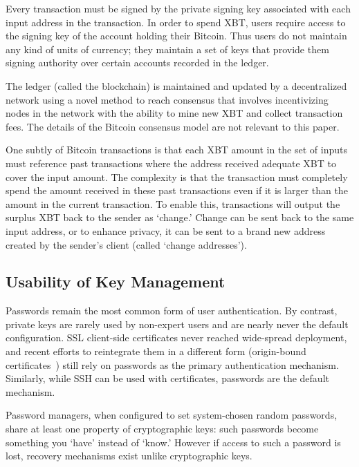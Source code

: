 Every transaction must be signed by the private signing key associated with each input address in the transaction. In order to spend XBT, users require access to the signing key of the account holding their Bitcoin. Thus users do not maintain any kind of units of currency; they maintain a set of keys that provide them signing authority over certain accounts recorded in the ledger. 

The ledger (called the blockchain) is maintained and updated by a decentralized network using a novel method to reach consensus that involves incentivizing nodes in the network with the ability to mine new XBT and collect transaction fees. The details of the Bitcoin consensus model are not relevant to this paper.

One subtly of Bitcoin transactions is that each XBT amount in the set of inputs must reference past transactions where the address received adequate XBT to cover the input amount. The complexity is that the transaction must completely spend the amount received in these past transactions even if it is larger than the amount in the current transaction. To enable this, transactions will output the surplus XBT back to the sender as `change.' Change can be sent back to the same input address, or to enhance privacy, it can be sent to a brand new address created by the sender's client (called `change addresses'). 

\subsection{Usability of Key Management}

Passwords remain the most common form of user authentication. By contrast, private keys are rarely used by non-expert users and are nearly never the default configuration. SSL client-side certificates never reached wide-spread deployment, and recent efforts to reintegrate them in a different form (\eg origin-bound certificates~\cite{DCBW12}) still rely on passwords as the primary authentication mechanism. Similarly, while SSH can be used with certificates, passwords are the default mechanism.

Password managers, when configured to set system-chosen random passwords, share at least one property of cryptographic keys: such passwords become something you `have' instead of `know.' However if access to such a password is lost, recovery mechanisms exist unlike cryptographic keys.

